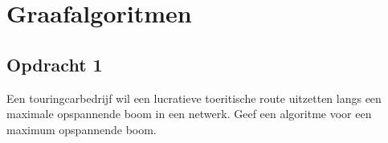 \chapter{Graafalgoritmen}
\section{Opdracht 1}
Een touringcarbedrijf wil een lucratieve toeritische route uitzetten langs een maximale opspannende boom in een netwerk. Geef een algoritme voor een maximum opspannende boom.
